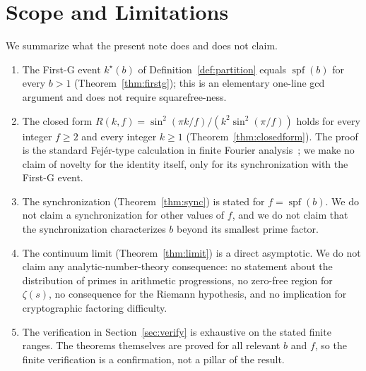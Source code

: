 \documentclass[11pt,reqno]{amsart}
\theoremstyle{plain}
\theoremstyle{definition}
\theoremstyle{remark}
\DeclareMathOperator{\spf}{spf}
\begin{document}
\section{Scope and Limitations}\label{sec:scope}

We summarize what the present note does and does not claim.

\begin{enumerate}[label={\upshape(\arabic*)}]
\item The First-G event $k^{\star}(b)$ of Definition~\ref{def:partition}
      equals $\spf(b)$ for every $b > 1$
      (Theorem~\ref{thm:firstg}); this is an elementary one-line gcd
      argument and does not require squarefree-ness.

\item The closed form $R(k,f) = \sin^{2}(\pi k/f)/
      (k^{2}\sin^{2}(\pi/f))$ holds for every integer $f \ge 2$ and
      every integer $k \ge 1$ (Theorem~\ref{thm:closedform}). The
      proof is the standard Fej\'{e}r-type calculation in finite
      Fourier analysis~\cite{Fejer1900,Zygmund2002}; we make no
      claim of novelty for the identity itself, only for its
      synchronization with the First-G event.

\item The synchronization (Theorem~\ref{thm:sync}) is stated for
      $f = \spf(b)$. We do not claim a synchronization for other
      values of $f$, and we do not claim that the
      synchronization characterizes $b$ beyond its smallest prime
      factor.

\item The continuum limit (Theorem~\ref{thm:limit}) is a direct
      asymptotic. We do not claim any analytic-number-theory
      consequence: no statement about the distribution of primes in
      arithmetic progressions, no zero-free region for $\zeta(s)$,
      no consequence for the Riemann hypothesis, and no implication
      for cryptographic factoring difficulty.

\item The verification in Section~\ref{sec:verify} is exhaustive on
      the stated finite ranges. The theorems themselves are proved
      for all relevant $b$ and $f$, so the finite verification is
      a confirmation, not a pillar of the result.
\end{enumerate}
\end{document}
